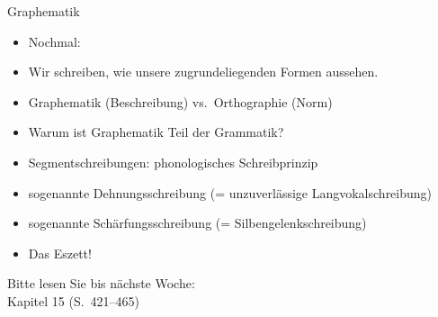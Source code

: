 \begin{frame}
  {Graphematik}
  \pause
  \begin{itemize}[<+->]
    \item Nochmal: 
    \item \alert{Wir schreiben, wie unsere zugrundeliegenden Formen aussehen.}
      \Halbzeile
    \item Graphematik (Beschreibung) vs.\ Orthographie (Norm)
    \item Warum ist Graphematik Teil der Grammatik?
      \Halbzeile
    \item Segmentschreibungen: \alert{phonologisches Schreibprinzip}
    \item sogenannte Dehnungsschreibung (= unzuverlässige Langvokalschreibung)
    \item sogenannte Schärfungsschreibung (= Silbengelenkschreibung)
      \Halbzeile
    \item \alert{Das Eszett!}
  \end{itemize}
  \pause
  \Halbzeile
  \begin{center}
    Bitte lesen Sie bis nächste Woche:\\
    \alert{Kapitel 15 (S.~421--465)}
  \end{center}
  \pause
  \pause
  \pause
  \pause
  \pause
\end{frame}

